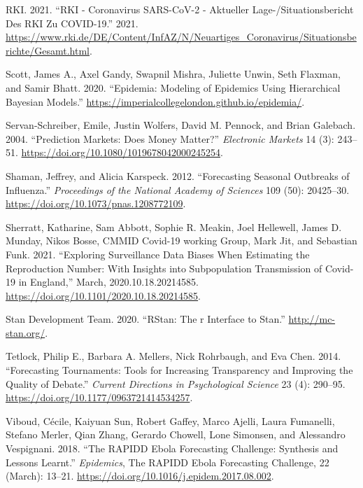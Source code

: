 \documentclass[
]{article}
\newlength{\cslhangindent}
\newlength{\cslentryspacingunit} %
\newenvironment{CSLReferences}[2] %
 {%
  \setlength{\parindent}{0pt}
  \ifodd #1
  \let\oldpar\par
  \def\par{\hangindent=\cslhangindent\oldpar}
  \fi
  \setlength{\parskip}{#2\cslentryspacingunit}
 }%
 {}
\begin{document}
\begin{CSLReferences}{1}{0}
\leavevmode{}%
RKI. 2021. {``{RKI} - {Coronavirus SARS}-{CoV}-2 - {Aktueller Lage}-/{Situationsbericht} Des {RKI} Zu {COVID}-19.''} 2021. \url{https://www.rki.de/DE/Content/InfAZ/N/Neuartiges_Coronavirus/Situationsberichte/Gesamt.html}.

\leavevmode{}%
Scott, James A., Axel Gandy, Swapnil Mishra, Juliette Unwin, Seth Flaxman, and Samir Bhatt. 2020. {``Epidemia: Modeling of Epidemics Using Hierarchical Bayesian Models.''} \url{https://imperialcollegelondon.github.io/epidemia/}.

\leavevmode{}%
Servan-Schreiber, Emile, Justin Wolfers, David M. Pennock, and Brian Galebach. 2004. {``Prediction {Markets}: Does {Money Matter}?''} \emph{Electronic Markets} 14 (3): 243--51. \url{https://doi.org/10.1080/1019678042000245254}.

\leavevmode{}%
Shaman, Jeffrey, and Alicia Karspeck. 2012. {``Forecasting Seasonal Outbreaks of Influenza.''} \emph{Proceedings of the National Academy of Sciences} 109 (50): 20425--30. \url{https://doi.org/10.1073/pnas.1208772109}.

\leavevmode{}%
Sherratt, Katharine, Sam Abbott, Sophie R. Meakin, Joel Hellewell, James D. Munday, Nikos Bosse, CMMID Covid-19 working Group, Mark Jit, and Sebastian Funk. 2021. {``Exploring Surveillance Data Biases When Estimating the Reproduction Number: With Insights into Subpopulation Transmission of {Covid}-19 in {England},''} March, 2020.10.18.20214585. \url{https://doi.org/10.1101/2020.10.18.20214585}.

\leavevmode{}%
Stan Development Team. 2020. {``RStan: The r Interface to Stan.''} \url{http://mc-stan.org/}.

\leavevmode{}%
Tetlock, Philip E., Barbara A. Mellers, Nick Rohrbaugh, and Eva Chen. 2014. {``Forecasting {Tournaments}: Tools for {Increasing Transparency} and {Improving} the {Quality} of {Debate}.''} \emph{Current Directions in Psychological Science} 23 (4): 290--95. \url{https://doi.org/10.1177/0963721414534257}.

\leavevmode{}%
Viboud, Cécile, Kaiyuan Sun, Robert Gaffey, Marco Ajelli, Laura Fumanelli, Stefano Merler, Qian Zhang, Gerardo Chowell, Lone Simonsen, and Alessandro Vespignani. 2018. {``The {RAPIDD} Ebola Forecasting Challenge: Synthesis and Lessons Learnt.''} \emph{Epidemics}, The {RAPIDD Ebola Forecasting Challenge}, 22 (March): 13--21. \url{https://doi.org/10.1016/j.epidem.2017.08.002}.


\end{CSLReferences}
\end{document}

